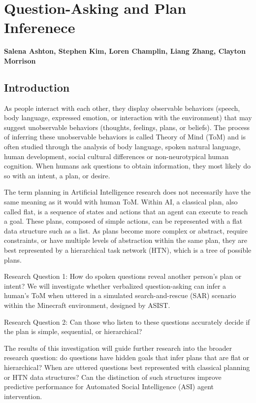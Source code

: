 \chapter{Question-Asking and Plan Inferenece}
\label{ch:question_plan}
\textbf{Salena Ashton, Stephen Kim, Loren Champlin, Liang Zhang, Clayton Morrison}

\section{Introduction}

As people interact with each other, they display observable behaviors (speech, body language, expressed emotion, or interaction with the environment) that may suggest unobservable behaviors (thoughts, feelings, plans, or beliefs). The process of inferring these unobservable behaviors is called Theory of Mind (ToM) and is often studied through the analysis of body language, spoken natural language, human development, social cultural differences or non-neurotypical human cognition. When humans ask questions to obtain information, they most likely do so with an intent, a plan, or desire.

The term planning in Artificial Intelligence research does not necessarily have the same meaning as it would with human ToM. Within AI, a classical plan, also called flat, is a sequence of states and actions that an agent can execute to reach a goal. These plans, composed of simple actions, can be represented with a flat data structure such as a list. As plans become more complex or abstract, require constraints, or have multiple levels of abstraction within the same plan, they are best represented by a hierarchical task network (HTN), which is a tree of possible plans.

Research Question 1: How do spoken questions reveal another person’s plan or intent?
We will investigate whether verbalized question-asking can infer a human’s ToM when uttered in a simulated search-and-rescue (SAR) scenario within the Minecraft environment, designed by ASIST.

Research Question 2: Can those who listen to these questions accurately decide if the plan is simple, sequential, or hierarchical?

The results of this investigation will guide further research into the broader research question: do questions have hidden goals that infer plans that are flat or hierarchical? When are uttered questions best represented with classical planning or HTN data structures?  Can the distinction of such structures improve predictive performance for Automated Social Intelligence (ASI) agent intervention.



